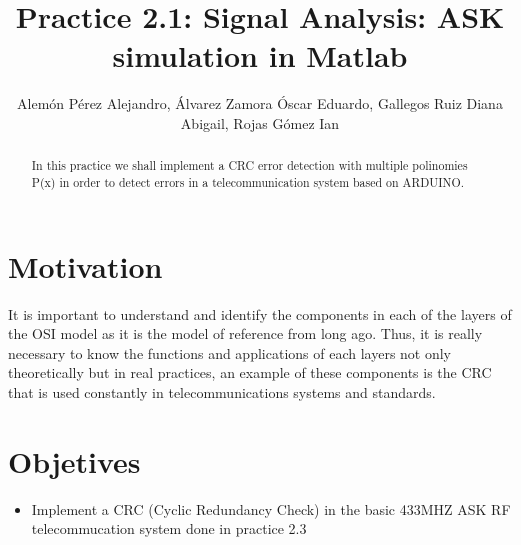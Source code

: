 \documentclass{IEEEtran}
\title{Practice 2.1: Signal Analysis: ASK simulation in Matlab}
\author{Alemón Pérez Alejandro, Álvarez Zamora Óscar Eduardo, Gallegos Ruiz Diana Abigail, Rojas Gómez Ian }
\begin{document}
	
	\maketitle
	\begin{abstract}
	In this practice we shall implement a CRC error detection with multiple polinomies P(x) in order to detect errors in a telecommunication system based on ARDUINO.
	\end{abstract}
	
	\section{Motivation}	
		It is important to understand and identify the components in each of the layers of the OSI model as it is the model of reference from long ago. Thus, it is really necessary to know the functions and applications of each layers not only theoretically but in real practices, an example of these components is the CRC that is used constantly in telecommunications systems and standards.
	
	\section{Objetives}
	\begin{itemize}
		
		\item 	Implement a CRC (Cyclic Redundancy Check) in the basic 433MHZ ASK RF telecommucation system done in practice 2.3
		
	\end{itemize}
	
	


	


	
\end{document}
